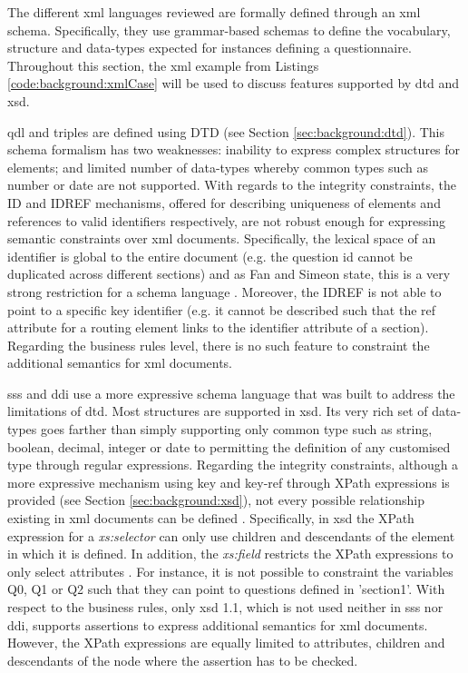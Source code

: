 	The different \gls{xml} languages reviewed are formally defined through an \gls{xml} schema. Specifically, they use grammar-based schemas to define the vocabulary, structure and data-types expected for instances defining a questionnaire. Throughout this section, the \gls{xml} example from Listings \ref{code:background:xmlCase} will be used to discuss features supported by \gls{dtd} and \gls{xsd}.

	\gls{qdl} and \gls{triples} are defined using DTD (see Section \ref{sec:background:dtd}). This schema formalism has two weaknesses: inability to express complex structures for elements; and limited number of data-types whereby common types such as number or date are not supported.%
	With regards to the integrity constraints, the ID and IDREF mechanisms, offered for describing uniqueness of elements and references to valid identifiers respectively, are not robust enough for expressing semantic constraints over \gls{xml} documents. Specifically, the lexical space of an identifier is global to the entire document (e.g. the question id cannot be duplicated across different sections) and as Fan and Simeon state, this is a very strong restriction for a schema language \cite{art:fan03}. Moreover, the IDREF is not able to point to a specific key identifier (e.g. it cannot be described such that the ref attribute for a routing element links to the identifier attribute of a section). Regarding the business rules level, there is no such feature to constraint the additional semantics for \gls{xml} documents.

	\gls{sss} and \gls{ddi} use a more expressive schema language that was built to address the limitations of \gls{dtd}. Most structures are supported in \gls{xsd}. Its very rich set of data-types goes farther than simply supporting only common type such as string, boolean, decimal, integer or date to permitting the definition of any customised type through regular expressions. Regarding the integrity constraints, although a more expressive mechanism using key and key-ref through XPath expressions is provided (see Section \ref{sec:background:xsd}), not every possible relationship existing in \gls{xml} documents can be defined \cite{web:w3cxsdassertion}. Specifically, in \gls{xsd} the XPath expression for a \emph{xs:selector} can only use children and descendants of the element in which it is defined. In addition, the \emph{xs:field} restricts the XPath expressions to only select attributes \cite{proc:vandervlist06}. For instance, it is not possible to constraint the variables Q0, Q1 or Q2 such that they can point to questions defined in 'section1'. With respect to the business rules, only \gls{xsd} 1.1, which is not used neither in \gls{sss} nor \gls{ddi}, supports assertions to express additional semantics for \gls{xml} documents. However, the XPath expressions are equally limited to attributes, children and descendants of the node where the assertion has to be checked.

